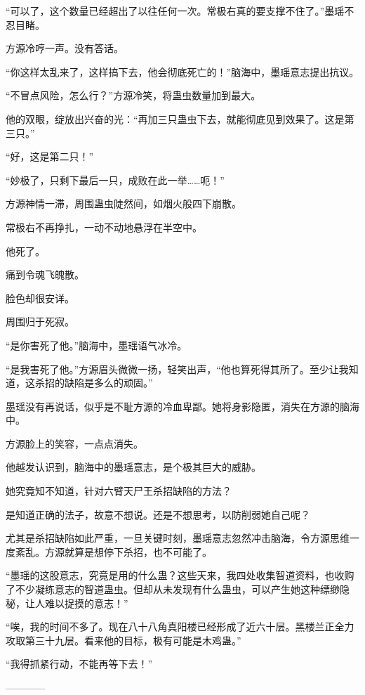 \begin{this_body}
“可以了，这个数量已经超出了以往任何一次。常极右真的要支撑不住了。”墨瑶不忍目睹。

方源冷哼一声。没有答话。

“你这样太乱来了，这样搞下去，他会彻底死亡的！”脑海中，墨瑶意志提出抗议。

“不冒点风险，怎么行？”方源冷笑，将蛊虫数量加到最大。

他的双眼，绽放出兴奋的光：“再加三只蛊虫下去，就能彻底见到效果了。这是第三只。”

“好，这是第二只！”

“妙极了，只剩下最后一只，成败在此一举……呃！”

方源神情一滞，周围蛊虫陡然间，如烟火般四下崩散。

常极右不再挣扎，一动不动地悬浮在半空中。

他死了。

痛到令魂飞魄散。

脸色却很安详。

周围归于死寂。

“是你害死了他。”脑海中，墨瑶语气冰冷。

“是我害死了他。”方源眉头微微一扬，轻笑出声，“他也算死得其所了。至少让我知道，这杀招的缺陷是多么的顽固。”

墨瑶没有再说话，似乎是不耻方源的冷血卑鄙。她将身影隐匿，消失在方源的脑海中。

方源脸上的笑容，一点点消失。

他越发认识到，脑海中的墨瑶意志，是个极其巨大的威胁。

她究竟知不知道，针对六臂天尸王杀招缺陷的方法？

是知道正确的法子，故意不想说。还是不想思考，以防削弱她自己呢？

尤其是杀招缺陷如此严重，一旦关键时刻，墨瑶意志忽然冲击脑海，令方源思维一度紊乱。方源就算是想停下杀招，也不可能了。

“墨瑶的这股意志，究竟是用的什么蛊？这些天来，我四处收集智道资料，也收购了不少凝练意志的智道蛊虫。但却从未发现有什么蛊虫，可以产生她这种缥缈隐秘，让人难以捉摸的意志！”

“唉，我的时间不多了。现在八十八角真阳楼已经形成了近六十层。黑楼兰正全力攻取第三十九层。看来他的目标，极有可能是木鸡蛊。”

“我得抓紧行动，不能再等下去！”

------------

\end{this_body}

